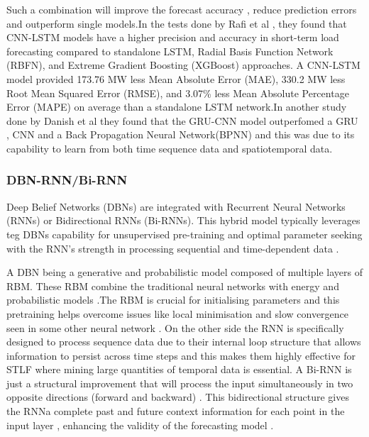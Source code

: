   Such a combination will improve the forecast accuracy  , reduce prediction errors and outperform single models.In the tests done by  Rafi et al \cite{rafi2021short} , they found that CNN-LSTM models have a higher precision and accuracy in short-term load forecasting compared to standalone LSTM, Radial Basis Function Network (RBFN), and Extreme Gradient Boosting (XGBoost) approaches. A CNN-LSTM model provided 173.76 MW less Mean Absolute Error (MAE), 330.2 MW less Root Mean Squared Error (RMSE), and 3.07\% less Mean Absolute Percentage Error (MAPE) on average than a standalone LSTM network.In another study done by Danish et al \cite{danish2025kolmogorov} they found that the GRU-CNN model outperfomed a GRU , CNN and a Back Propagation Neural Network(BPNN) and this was due to its capability to learn from both time sequence data and spatiotemporal data.
  

 \subsubsection{DBN-RNN/Bi-RNN}
 Deep Belief Networks (DBNs) are integrated with Recurrent Neural Networks (RNNs) or Bidirectional RNNs (Bi-RNNs). This hybrid model typically leverages teg  DBNs capability for unsupervised pre-training and optimal parameter seeking with the RNN's strength in processing sequential and time-dependent data \cite{tang2019application}.
 
 A DBN being a generative and probabilistic model composed of multiple layers of RBM. These RBM combine the traditional neural networks with energy and probabilistic models  \cite{dong2021short}.The RBM is crucial for initialising parameters and this pretraining helps overcome issues like local minimisation and slow convergence seen in some other neural network \cite{gao2021cooling}. On the other side the RNN is specifically designed to process sequence data due to their internal loop structure that allows information to persist across time steps \cite{wang2018short} and this makes them highly effective for STLF where mining large quantities of temporal data is essential. A Bi-RNN is just a structural improvement that will process the input simultaneously in two opposite directions (forward and backward) \cite{tang2019application} . This bidirectional structure gives the RNNa complete past and future context information for each point in the input layer  , enhancing the validity of the forecasting model \cite{tang2019application}.
 
